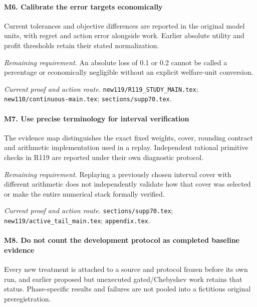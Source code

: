 \paragraph{M6. Calibrate the error targets economically}

Current tolerances and objective differences are reported in the original model units, with regret and action error alongside work. Earlier absolute utility and profit thresholds retain their stated normalization.

\par\emph{Remaining requirement.} An absolute loss of 0.1 or 0.2 cannot be called a percentage or economically negligible without an explicit welfare-unit conversion.

\par\emph{Current proof and action route.} \nolinkurl{new119/R119_STUDY_MAIN.tex}; \nolinkurl{new110/continuous-main.tex}; \nolinkurl{sections/supp70.tex}.

\paragraph{M7. Use precise terminology for interval verification}

The evidence map distinguishes the exact fixed weights, cover, rounding contract and arithmetic implementation used in a replay. Independent rational primitive checks in R119 are reported under their own diagnostic protocol.

\par\emph{Remaining requirement.} Replaying a previously chosen interval cover with different arithmetic does not independently validate how that cover was selected or make the entire numerical stack formally verified.

\par\emph{Current proof and action route.} \nolinkurl{sections/supp70.tex}; \nolinkurl{new119/active_tail_main.tex}; \nolinkurl{appendix.tex}.

\paragraph{M8. Do not count the development protocol as completed baseline evidence}

Every new treatment is attached to a source and protocol frozen before its own run, and earlier proposed but unexecuted gated/\allowbreak{}Chebyshev work retains that status. Phase-specific results and failures are not pooled into a fictitious original preregistration.

